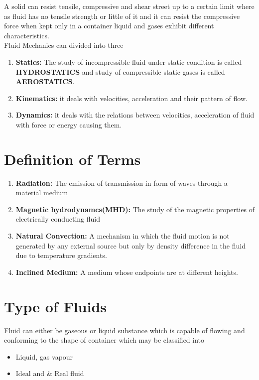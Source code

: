 \documentclass[12pt]{report}
\newcommand{\bt}[1]{\textbf{#1}}
\newcommand{\NI}{\noindent}
\begin{document}
	\NI A solid can resist tensile, compressive and shear street up to a certain limit where as fluid has no tensile strength or little of it and it can resist the compressive force when kept only in a container liquid and gases exhibit different characteristics.\\
	
	\NI Fluid Mechanics can divided into three
	\begin{enumerate}
		\item \bt{Statics:} The study of incompressible fluid under static condition is called \bt{HYDROSTATICS} and study of compressible static gases is called \bt{AEROSTATICS}.
		
		\item \bt{Kinematics:} it deals with velocities, acceleration and their pattern of flow.
		
		\item \bt{Dynamics:} it deals with the relations between velocities, acceleration of fluid with force or energy causing them.
	\end{enumerate}
	
	\section{Definition of Terms}
	\begin{enumerate}
		\item \bt{Radiation:} The emission of transmission in form of waves through a material medium
		
		\item \bt{Magnetic hydrodynamcs(MHD):} The study of the magnetic properties of electrically conducting fluid
		
		\item \bt{Natural Convection:} A mechanism in which the fluid motion is not generated by any external source but only by density difference in the fluid due to temperature gradients.
		
		\item \bt{Inclined Medium:} A medium whose endpoints are at different heights.
	\end{enumerate}

	\section{Type of Fluids}
	Fluid can either be gaseous or liquid substance which is capable of flowing and conforming to the shape of container which may be classified into
	\begin{itemize}
		\item Liquid, gas vapour	
		\item Ideal and \& Real fluid
	\end{itemize}
	
\end{document}
